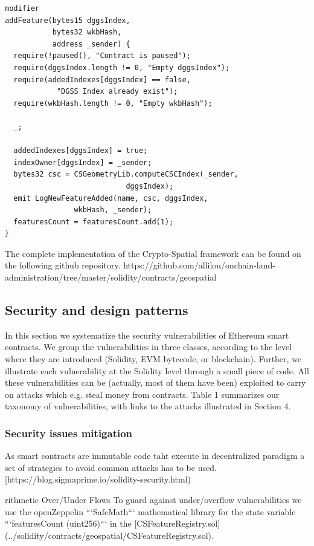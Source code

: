 \documentclass{isprs} %
\begin{document}
\begin{verbatim}
modifier 
addFeature(bytes15 dggsIndex, 
		   bytes32 wkbHash, 
		   address _sender) {
  require(!paused(), "Contract is paused");
  require(dggsIndex.length != 0, "Empty dggsIndex");
  require(addedIndexes[dggsIndex] == false, 
  			"DGSS Index already exist");
  require(wkbHash.length != 0, "Empty wkbHash");

  _;

  addedIndexes[dggsIndex] = true;
  indexOwner[dggsIndex] = _sender;
  bytes32 csc = CSGeometryLib.computeCSCIndex(_sender, 
  							dggsIndex); 
  emit LogNewFeatureAdded(name, csc, dggsIndex, 
  				wkbHash, _sender);
  featuresCount = featuresCount.add(1);
}
\end{verbatim}

The complete implementation of the Crypto-Spatial framework can be found on the following github repository.
https://github.com/allilou/onchain-land-administration/tree/master/solidity/contracts/geospatial

\subsection{Security and design patterns}\label{sec:Security issues and design patterns}

In this section we systematize the security vulnerabilities of Ethereum smart
contracts. We group the vulnerabilities in three classes, according to the level
where they are introduced (Solidity, EVM bytecode, or blockchain). Further, we
illustrate each vulnerability at the Solidity level through a small piece of code.
All these vulnerabilities can be (actually, most of them have been) exploited to
carry on attacks which e.g. steal money from contracts. Table 1 summarizes our
taxonomy of vulnerabilities, with links to the attacks illustrated in Section 4.

\subsubsection{Security issues mitigation}\label{sec:Security issues mitigation}

As smart contracts are immutable code taht execute in decentralized paradigm a set of strategies to avoid common attacks has to be used. [https://blog.sigmaprime.io/solidity-security.html) 

rithmetic Over/Under Flows
To guard against under/overflow vulnerabilities we use the openZeppelin ```SafeMath``` mathematical library for the state variable ```featuresCount (uint256)``` in the [CSFeatureRegistry.sol](../solidity/contracts/geospatial/CSFeatureRegistry.sol).
\end{document}
